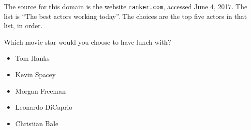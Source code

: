 
The source for this domain is the website \texttt{ranker.com}, accessed June 4, 2017.
The list is ``The best actors working today''.
The choices are the top five actors in that list, in order.

\begin{tcolorbox}
Which movie star would you choose to have lunch with?

\begin{itemize}
	\setlength\itemsep{-5pt}
	\item Tom Hanks
	\item Kevin Spacey
	\item Morgan Freeman
	\item Leonardo DiCaprio
	\item Christian Bale
\end{itemize}
\end{tcolorbox}